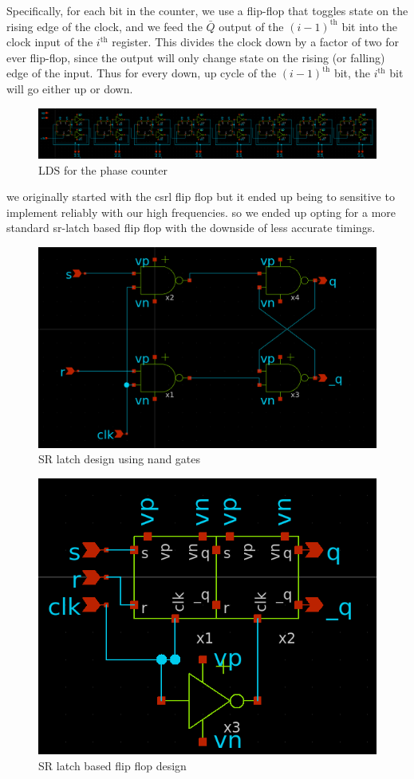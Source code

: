 \documentclass{article}
\begin{document}
Specifically, for each bit in the counter, we use a flip-flop that toggles state on the rising edge of the clock, and we feed the $\bar{Q}$ output of the $(i-1)^\text{th}$ bit into the clock input of the $i^\text{th}$ register. This divides the clock down by a factor of two for ever flip-flop, since the output will only change state on the rising (or falling) edge of the input. Thus for every down, up cycle of the $(i-1)^\text{th}$ bit, the $i^\text{th}$ bit will go either up or down.
\begin{figure}
    \centering
    \includegraphics[width=1.0\linewidth]{images/phase_counter_schematic.png}
    \caption{LDS for the phase counter}
    \label{fig:enter-label}
\end{figure}
we originally started with the csrl flip flop but it ended up being to sensitive to implement reliably with our high frequencies. so we ended up opting for a more standard sr-latch based flip flop with the downside of less accurate timings.
\begin{figure}
    \centering
    \includegraphics[width=0.5\linewidth]{images/sr_latch.png}
    \caption{SR latch design using nand gates}
    \label{fig:enter-label}
\end{figure}
\begin{figure}
    \centering
    \includegraphics[width=0.5\linewidth]{images/edge_triggered_flip_flop.png}
    \caption{SR latch based flip flop design}
    \label{fig:enter-label}
\end{figure}
\end{document}
